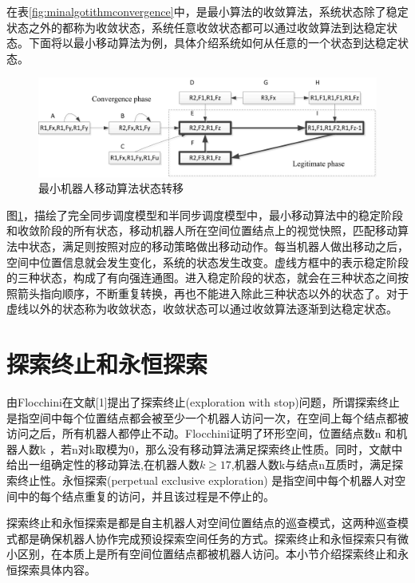 在表\ref{fig:minalgotithmconvergence}中，是最小算法的收敛算法，系统状态除了稳定状态之外的都称为收敛状态，系统任意收敛状态都可以通过收敛算法到达稳定状态。下面将以最小移动算法为例，具体介绍系统如何从任意的一个状态到达稳定状态。

\vspace{0.5cm}

\begin{figure}[!hbt]
	\centering
	\includegraphics[width=6 in]{fig/cp_lp.png}
	\caption{最小机器人移动算法状态转移}
	\label{fig:cp_lp}
\end{figure}

\vspace{0.5cm}

图\ref{fig:cp_lp}，描绘了完全同步调度模型和半同步调度模型中，最小移动算法中的稳定阶段和收敛阶段的所有状态，移动机器人所在空间位置结点上的视觉快照，匹配移动算法中状态，满足则按照对应的移动策略做出移动动作。每当机器人做出移动之后，空间中位置信息就会发生变化，系统的状态发生改变。虚线方框中的表示稳定阶段的三种状态，构成了有向强连通图。进入稳定阶段的状态，就会在三种状态之间按照箭头指向顺序，不断重复转换，再也不能进入除此三种状态以外的状态了。对于虚线以外的状态称为收敛状态，收敛状态可以通过收敛算法逐渐到达稳定状态。

\section{探索终止和永恒探索}
由Flocchini在文献[1]提出了探索终止(exploration with stop)问题，所谓探索终止是指空间中每个位置结点都会被至少一个机器人访问一次，在空间上每个结点都被访问之后，所有机器人都停止不动。Flocchini证明了环形空间，位置结点数n 和机器人数k ，若n对k取模为0，那么没有移动算法满足探索终止性质。同时，文献中给出一组确定性的移动算法,在机器人数$k \geq 17$,机器人数k与结点n互质时，满足探索终止性。永恒探索(perpetual exclusive exploration) 是指空间中每个机器人对空间中的每个结点重复的访问，并且该过程是不停止的。

探索终止和永恒探索是都是自主机器人对空间位置结点的巡查模式，这两种巡查模式都是确保机器人协作完成预设探索空间任务的方式。探索终止和永恒探索只有微小区别，在本质上是所有空间位置结点都被机器人访问。本小节介绍探索终止和永恒探索具体内容。

